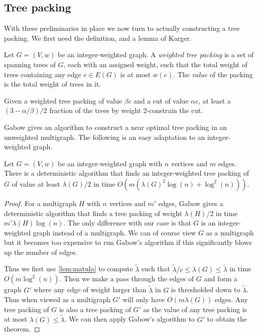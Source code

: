 \subsection{Tree packing}
With these preliminaries in place we now turn to actually constructing a tree packing.  We first need the definition, and a lemma of Karger.
\begin{definition}
Let $G = (V,w)$ be an integer-weighted graph.  A \emph{weighted tree packing} is a set of spanning trees of $G$, each with an assigned weight, such that 
the total weight of trees containing any edge $e \in E(G)$ is at most $w(e)$.  The \emph{value} of the packing is the total weight of trees in it.  
\end{definition}

\begin{lemma}
\label{lem:frac_trees}
Given a weighted tree packing of value $\beta c$ and a cut of value $\alpha c$, at least a $(3-\alpha/\beta)/2$ fraction of the trees by weight 2-constrain the cut.
\end{lemma}

Gabow gives an algorithm to construct a near optimal tree packing in an unweighted multigraph.  The following is an easy adaptation to an integer-weighted graph.
\begin{lemma}
\label{lem:tree_packing}
Let $G = (V,w)$ be an integer-weighted graph with $n$ vertices and $m$ edges.  There is a deterministic algorithm that finds an integer-weighted tree packing of $G$ of value at least 
$\lambda(G)/2$ in time $O(m (\lambda(G)^2 \log(n) + \log^2(n)))$.  
\end{lemma}

\begin{proof}
For a multigraph $H$ with $n$ vertices and $m'$ edges, Gabow \cite{Gabow95} gives a deterministic algorithm that finds a tree packing of weight $\lambda(H)/2$ in time 
$m' \lambda(H) \log(n)$.  The only difference with our case is that $G$ is an integer-weighted graph instead of a multigraph.  We can of course view $G$ as a multigraph but it 
becomes too expensive to run Gabow's algorithm if this significantly blows up the number of edges.  

Thus we first use \cref{lem:matula} to compute $\tilde \lambda$ such that $\tilde \lambda/c \le \lambda(G) \le \tilde \lambda$ in time $O(m \log^2(n))$.  Then we make a pass through the 
edges of $G$ and form a graph $G'$ where any edge of weight larger than $\tilde \lambda$ in $G$ is thresholded down to $\tilde \lambda$.  Thus when viewed as a multigraph $G'$ will only have $O(m \lambda(G))$ edges.  Any tree packing of $G$ is also a tree packing of $G'$ as the value of any tree packing is at most $\lambda(G) \le \tilde \lambda$.  We can then apply Gabow's algorithm to $G'$ to obtain the theorem.
\end{proof}

